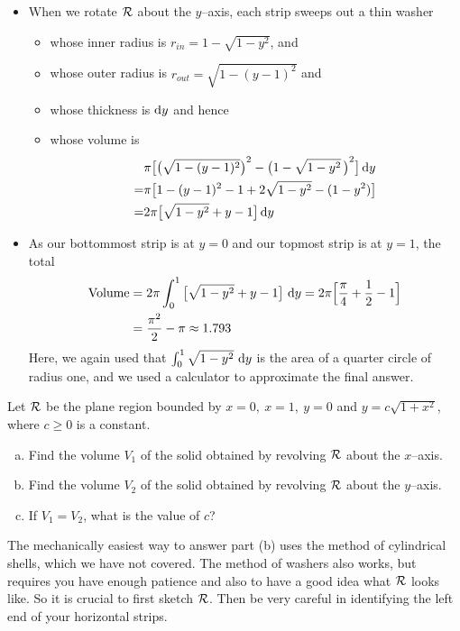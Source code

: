 \begin{solution}
\begin{itemize}
\item When we rotate $\mathcal{R}$ about the $y$--axis,  each strip
sweeps out a thin washer
\begin{itemize}
\item
whose inner radius is $r_{in}=1-\sqrt{1-y^2}$, and
\item
whose outer radius is $r_{out}= \sqrt{1-(y-1)^2}$ and
\item
whose thickness is $\mathrm{d}y$ and hence
\item
whose volume is
\begin{align*}
&\pi\big[{\big(\sqrt{1-(y-1)^2}\big)}^2-{\big(1-\sqrt{1-y^2}\,\big)}^2\big]\,\mathrm{d}y\\
=&\pi \big[  1 - (y-1)^2       -1 + 2\sqrt{1-y^2} - (1-y^2)   \big]\\
=&2\pi\big[\sqrt{1-y^2}+y-1\big]\,\mathrm{d}y\end{align*}

\end{itemize}
\item As our bottommost strip is at $y=0$ and our topmost
strip is at $y=1$, the total
\begin{align*}
{\rm Volume} &= 2\pi\int_{0}^1\big[\sqrt{1-y^2}+y-1\big]\ \mathrm{d}y
= 2\pi\Big[\frac{\pi}{4}+\frac{1}{2}-1\Big]\\
&=\frac{\pi^2}{2}-\pi\approx 1.793
\end{align*}
Here, we again used that $\int_{0}^1 \sqrt{1-y^2}\ \mathrm{d}y$ is the area of a quarter
circle of radius one, and we used a calculator to approximate the final answer.
\end{itemize}

\end{solution}

\begin{Mquestion}[1997A]
Let $\mathcal{R}$ be the plane region bounded by $x=0,\ x=1,\ y=0$
and $y=c\sqrt{1+x^2}$, where $c\ge 0$ is a constant.
\begin{enumerate}[(a)]
\item
Find the volume $V_1$ of the solid obtained by revolving
$\mathcal{R}$ about the $x$--axis.
\item
Find the volume $V_2$ of the solid obtained by revolving
$\mathcal{R}$ about the $y$--axis.
\item
 If $V_1=V_2$, what is the value of $c$?
\end{enumerate}
\end{Mquestion}

\begin{hint}
The mechanically easiest way to answer part (b) uses the method of cylindrical
shells, which we have not covered.  The method of washers also works, but requires  you have enough patience and also
to have a good idea what $\mathcal{R}$ looks like. So it is crucial to first sketch $\mathcal{R}$.
Then be very careful in identifying the left end of your horizontal strips.
\end{hint}


